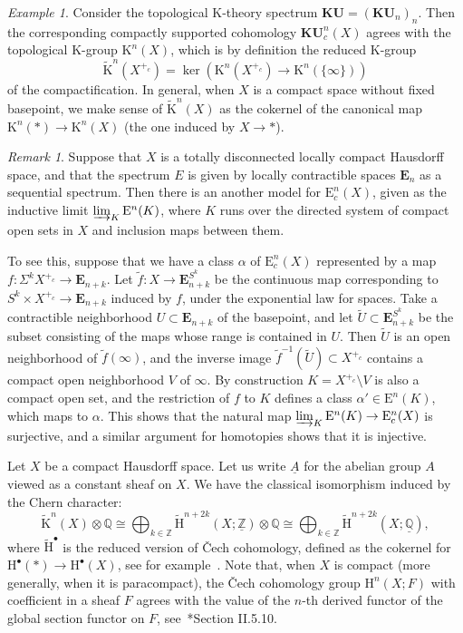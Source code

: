 \documentclass[a4paper,reqno]{amsart}
\theoremstyle{plain}
\theoremstyle{definition}
\theoremstyle{remark}
\newtheorem{example}[theorem]{Example}
\newtheorem{remark}[theorem]{Remark}
\numberwithin{equation}{section}
\newcommand{\rE}{\mathrm{E}}
\newcommand{\rH}{\mathrm{H}}
\newcommand{\rK}{\mathrm{K}}
\newcommand{\dQ}{\mathbb{Q}}
\newcommand{\dZ}{\mathbb{Z}}
\newcommand{\bE}{\mathbf{E}}
\newcommand{\KU}{\mathbf{KU}}
\begin{document}
\begin{example}
Consider the topological $\rK$-theory spectrum $\KU = (\KU_n)_n$. Then the corresponding compactly supported cohomology $\KU_c^n(X)$ agrees with the topological $\rK$-group $\rK^n(X)$, which is by definition the reduced $\rK$-group
\[
\tilde{\rK}^n(X^{+_c}) = \ker ( \rK^n(X^{+_c}) \to \rK^n(\{ \infty \}) )
\]
of the compactification.
In general, when $X$ is a compact space without fixed basepoint, we make sense of $\tilde{\rK}^n(X)$ as the cokernel of the canonical map $\rK^n(*) \to \rK^n(X)$ (the one induced by $X \to *$).
\end{example}

\begin{remark}%
Suppose that $X$ is a totally disconnected locally compact Hausdorff space, and that the spectrum $E$ is given by locally contractible spaces $\bE_n$ as a sequential spectrum. Then there is an another model for $\rE_c^n(X)$, given as the inductive limit $\varinjlim_K \rE^n(K)$, where $K$ runs over the directed system of compact open sets in $X$ and inclusion maps between them.

To see this, suppose that we have a class $\alpha$ of $\rE_c^n(X)$ represented by a map $f \colon \Sigma^k X^{+_c} \to \bE_{n + k}$.
Let $\tilde{f}\colon X \to \bE_{n + k}^{S^k}$ be the continuous map corresponding to $S^k \times X^{+_c} \to \bE_{n + k}$ induced by $f$, under the exponential law for spaces.
Take a contractible neighborhood $U \subset \bE_{n + k}$ of the basepoint, and let $\tilde{U} \subset \bE_{n + k}^{S^k}$ be the subset consisting of the maps whose range is contained in $U$.
Then $\tilde{U}$ is an open neighborhood of $\tilde{f}(\infty)$, and the inverse image $\tilde{f}^{-1}(\tilde{U}) \subset X^{+_c}$ contains a compact open neighborhood $V$ of $\infty$.
By construction $K = X^{+_c} \setminus V$ is also a compact open set, and the restriction of $f$ to $K$ defines a class $\alpha' \in \rE^n(K)$, which maps to $\alpha$. This shows that the natural map $\varinjlim_K \rE^n(K) \to \rE_c^n(X)$ is surjective, and a similar argument for homotopies shows that it is injective.
\end{remark}

Let $X$ be a compact Hausdorff space. Let us write $\underline{A}$ for the abelian group $A$ viewed as a constant sheaf on $X$. We have the classical isomorphism induced by the Chern character:
\begin{equation}\label{eq:ch}
\tilde{\rK}^n(X) \otimes \dQ \cong \bigoplus_{k \in \dZ} \tilde{\rH}^{n + 2 k}(X; \underline{\dZ}) \otimes \dQ \cong \bigoplus_{k \in \dZ} \tilde{\rH}^{n + 2 k}(X; \underline{\dQ}),
\end{equation}
where $\tilde{\rH}^\bullet$ is the reduced version of Čech cohomology, defined as the cokernel for $\rH^\bullet(*) \to \rH^\bullet(X)$, see for example~\cite{karoubi-cartan-seminar-16}.
Note that, when $X$ is compact (more generally, when it is paracompact), the Čech cohomology group $\rH^n(X; F)$ with coefficient in a sheaf $F$ agrees with the value of the $n$-th derived functor of the global section functor on $F$, see~\cite{god:fais}*{Section II.5.10}.
            
\end{document}
